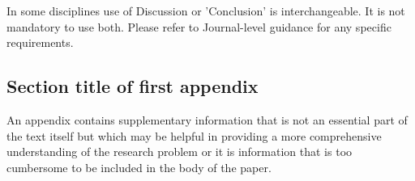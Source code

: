 \documentclass[pdflatex,sn-mathphys]{sn-jnl}%
\theoremstyle{thmstyleone}%
\theoremstyle{thmstyletwo}%
\theoremstyle{thmstylethree}%
\begin{document}
In some disciplines use of Discussion or 'Conclusion' is interchangeable. It is not mandatory to use both. Please refer to Journal-level guidance for any specific requirements. 

\backmatter

\begin{appendices}

\section{Section title of first appendix}\label{secA1}

An appendix contains supplementary information that is not an essential part of the text itself but which may be helpful in providing a more comprehensive understanding of the research problem or it is information that is too cumbersome to be included in the body of the paper.




\end{appendices}


%

\end{document}
